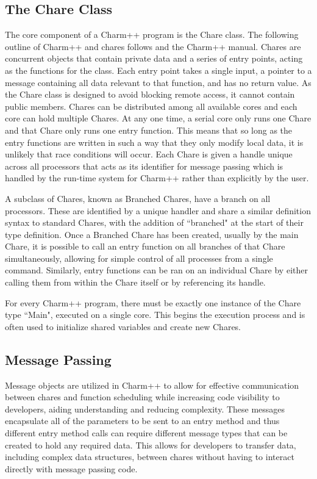 \subsection{The Chare Class}
\label{sec:chare}
The core component of a Charm++ program is the Chare class. The following outline of Charm++ and chares follows \citet{Charm2} and the Charm++ manual. Chares are concurrent objects that contain private data and a series of entry points, acting as the functions for the class. Each entry point takes a single input, a pointer to a message containing all data relevant to that function, and has no return value. As the Chare class is designed to avoid blocking remote access, it cannot contain public members. Chares can be distributed among all available cores and each core can hold multiple Chares. At any one time, a serial core only runs one Chare and that Chare only runs one entry function. This means that so long as the entry functions are written in such a way that they only modify local data, it is unlikely that race conditions will occur. Each Chare is given a handle unique across all processors that acts as its identifier for message passing which is handled by the run-time system for Charm++ rather than explicitly by the user.

A subclass of Chares, known as Branched Chares, have a branch on all processors. These are identified by a unique handler and share a similar definition syntax to standard Chares, with the addition of ``branched" at the start of their type definition. Once a Branched Chare has been created, usually by the main Chare, it is possible to call an entry function on all branches of that Chare simultaneously, allowing for simple control of all processes from a single command. Similarly, entry functions can be ran on an individual Chare by either calling them from within the Chare itself or by referencing its handle.

For every Charm++ program, there must be exactly one instance of the Chare type ``Main", executed on a single core. This begins the execution process and is often used to initialize shared variables and create new Chares. 

\subsection{Message Passing}

Message objects are utilized in Charm++ to allow for effective communication between chares and function scheduling while increasing code visibility to developers, aiding understanding and reducing complexity. These messages encapsulate all of the parameters to be sent to an entry method and thus different entry method calls can require different message types that can be created to hold any required data. This allows for developers to transfer data, including complex data structures, between chares without having to interact directly with message passing code.

